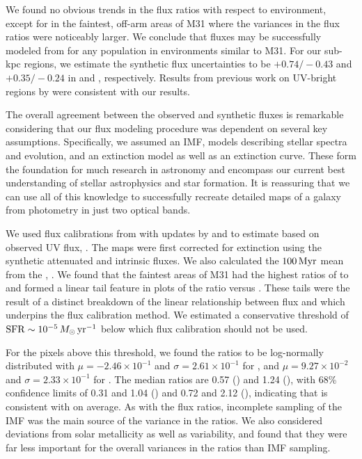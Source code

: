 \documentclass[iop, tighten]{emulateapj}
\begin{document}
We found no obvious trends in the flux ratios with respect to environment,
except for in the faintest, off-arm areas of M31 where the variances in the flux
ratios were noticeably larger. We conclude that fluxes may be successfully
modeled from  for any population in environments similar to M31. For our
sub-kpc regions, we estimate the synthetic flux uncertainties to be
$+\!0.74/\!-\!0.43$ and $+\!0.35/\!-\!0.24$ in \fuv{} and \nuv{}, respectively.
Results from previous work on UV-bright regions by \citet{Simones:2014} were
consistent with our results.

The overall agreement between the observed and synthetic fluxes is remarkable
considering that our flux modeling procedure was dependent on several key
assumptions. Specifically, we assumed an IMF, models describing stellar spectra
and evolution, and an extinction model as well as an extinction curve. These
form the foundation for much research in astronomy and encompass our current
best understanding of stellar astrophysics and star formation. It is reassuring
that we can use all of this knowledge to successfully recreate detailed maps of
a galaxy from photometry in just two optical bands.

We used flux calibrations from \citet{Kennicutt:1998} with updates by
\citet{Hao:2011} and \citet{Murphy:2011} to estimate  based on observed
UV flux, \sfrx{}. The \fxobs{} maps were first corrected for extinction using
the synthetic attenuated and intrinsic fluxes. We also calculated the $100\,\mathrm{Myr}$
mean \sfr{} from the , \sfroneh{}. We found that the faintest areas of
M31 had the highest ratios of \sfrx{} to \sfroneh{} and formed a linear tail
feature in plots of the \sfr{} ratio versus \sfroneh{}. These tails were the
result of a distinct breakdown of the linear relationship between flux and
\sfr{} which underpins the flux calibration method. We estimated a conservative
threshold of $\mathrm{SFR} \sim 10^{-5}\,M_\odot\,\mathrm{yr}^{-1}$ below which flux calibration
should not be used.

For the pixels above this threshold, we found the \sfr{} ratios to be
log-normally distributed with $\mu = -2.46\times 10^{-1}$ and $\sigma =
2.61\times 10^{-1}$ for \fuv{}, and $\mu = 9.27\times 10^{-2}$ and $\sigma =
2.33\times 10^{-1}$ for \nuv{}. The median ratios are 0.57 (\fuv{}) and 1.24
(\nuv{}), with 68\% confidence limits of 0.31 and 1.04 (\fuv{}) and 0.72 and
2.12 (\nuv{}), indicating that \sfrx{} is consistent with \sfroneh{} on
average. As with the flux ratios, incomplete sampling of the IMF was the main
source of the variance in the \sfr{} ratios. We also considered deviations from
solar metallicity as well as \sfh{} variability, and found that they were far
less important for the overall variances in the \sfr{} ratios than IMF
sampling.
\end{document}

